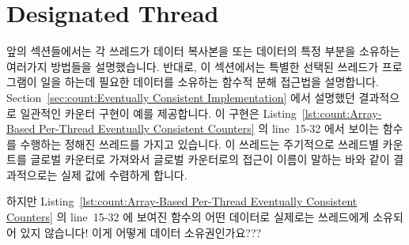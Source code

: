 \section{Designated Thread}
\label{sec:owned:Designated Thread}

앞의 섹션들에서는 각 쓰레드가 데이터 복사본을 또는 데이터의 특정 부분을
소유하는 여러가지 방법들을 설명했습니다.
반대로, 이 섹션에서는 특별한 선택된 쓰레드가 프로그램이 일을 하는데 필요한
데이터를 소유하는 함수적 분해 접근법을 설명합니다.
Section~\ref{sec:count:Eventually Consistent Implementation} 에서 설명했던
결과적으로 일관적인 카운터 구현이 예를 제공합니다.
이 구현은
Listing~\ref{lst:count:Array-Based Per-Thread Eventually Consistent Counters} 의
line~15-32 에서 보이는  함수를 수행하는 정해진 쓰레드를 가지고
있습니다.
이  쓰레드는 주기적으로 쓰레드별 카운트를 글로벌 카운터로
가져와서 글로벌 카운터로의 접근이 이름이 말하는 바와 같이 결과적으로는 실제
값에 수렴하게 합니다.
\iffalse

The earlier sections describe ways of allowing each thread to keep its
own copy or its own portion of the data.
In contrast, this section describes a functional-decomposition approach,
where a special designated thread owns the rights to the data
that is required to do its job.
The eventually consistent counter implementation described in
Section~\ref{sec:count:Eventually Consistent Implementation} provides an example.
This implementation has a designated thread that runs the
\co{eventual()} function shown on lines~15-32 of
Listing~\ref{lst:count:Array-Based Per-Thread Eventually Consistent Counters}.
This \co{eventual()} thread periodically pulls the per-thread counts
into the global counter, so that accesses to the global counter will,
as the name says, eventually converge on the actual value.
\fi

\QuickQuiz{}
	하지만
	Listing~\ref{lst:count:Array-Based Per-Thread Eventually Consistent Counters}
	의 line~15-32 에 보여진  함수의 어떤 데이터로 실제로는
	 쓰레드에게 소유되어 있지 않습니다!
	이게 어떻게 데이터 소유권인가요???
	\iffalse

